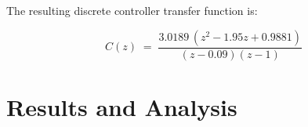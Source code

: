 \documentclass[conference]{IEEEtran}
\begin{document}
The resulting discrete controller transfer function is:
\begin{center}


\begin{equation} 
  C(z) \;=\; \frac{3.0189\,(z^2 - 1.95z + 0.9881)}{(z - 0.09)(z - 1)}
  \label{eq:pid_discrete}
\end{equation}
\end{center}



\section{Results and Analysis}
\label{sec:results}
\end{document}
